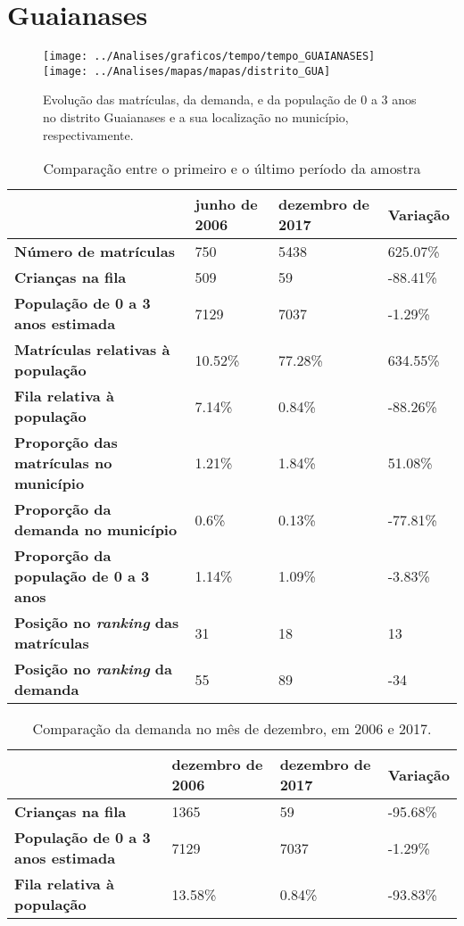 \section{Guaianases}
\begin{figure}[H]
\centering
\texttt{[image: ../Analises/graficos/tempo/tempo\_GUAIANASES]}
\texttt{[image: ../Analises/mapas/mapas/distrito\_GUA]}
\caption{Evolução das matrículas, da demanda, e da população de 0 a 3 anos no distrito Guaianases e a sua localização no município, respectivamente.}
\end{figure}
\begin{table}[H]
\begin{tabular}{l|l|l|l}
\textbf{}                                      & \textbf{junho de 2006}       & \textbf{dezembro de 2017}    & \textbf{Variação} \\ \hline
\textbf{Número de matrículas}                  & 750 & 5438 & 625.07\% \\ \hline
\textbf{Crianças na fila}                      & 509 & 59 & -88.41\% \\ \hline
\textbf{População de 0 a 3 anos estimada}      & 7129 & 7037 & -1.29\% \\ \hline
\textbf{Matrículas relativas à população}      & 10.52\% & 77.28\% & 634.55\% \\ \hline
\textbf{Fila relativa à população}             & 7.14\% & 0.84\% & -88.26\% \\ \hline
\textbf{Proporção das matrículas no município} & 1.21\% & 1.84\% & 51.08\% \\ \hline
\textbf{Proporção da demanda no município}     & 0.6\% & 0.13\% & -77.81\% \\ \hline
\textbf{Proporção da população de 0 a 3 anos}  & 1.14\% & 1.09\% & -3.83\% \\ \hline
\textbf{Posição no \textit{ranking} das matrículas}     & 31 & 18 & 13 \\ \hline
\textbf{Posição no \textit{ranking} da demanda}         & 55 & 89 & -34 \\ 
\end{tabular}
\caption{Comparação entre o primeiro e o último período da amostra}
\end{table}
\begin{table}[H]
\begin{tabular}{l|l|l|l}
\textbf{}                                 & \textbf{dezembro de 2006} & \textbf{dezembro de 2017} & \textbf{Variação} \\ \hline
\textbf{Crianças na fila}                      & 1365 & 59 & -95.68\% \\ \hline
\textbf{População de 0 a 3 anos estimada}      & 7129 & 7037 & -1.29\% \\ \hline
\textbf{Fila relativa à população}             & 13.58\% & 0.84\% & -93.83\% \\
\end{tabular}
\caption{Comparação da demanda no mês de dezembro, em 2006 e 2017.}
\end{table}
